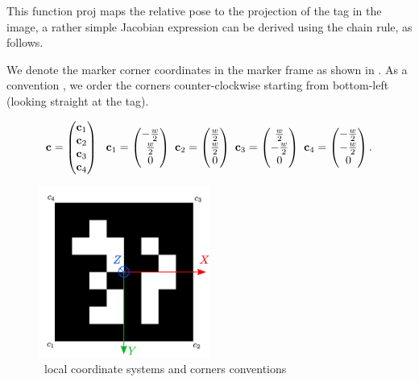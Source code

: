 This function $\text{proj}$ maps the relative pose to the projection of the tag in the image, a rather simple Jacobian expression can be derived using the chain rule, as follows.

We denote the marker corner coordinates in the marker frame as shown in . As a convention 
\cite{wang2016iros}, we order the corners counter-clockwise starting from bottom-left (looking straight at the tag). 

\begin{equation}
    {\bf c} =
    \begin{pmatrix}
    {\bf c}_1 \\ {\bf c}_2 \\ {\bf c}_3 \\ {\bf c}_4
    \end{pmatrix}
    ~~
    {\bf c}_1 =  \begin{pmatrix} -\frac{w}{2} \\ \frac{w}{2} \\ 0 \end{pmatrix}
    ~ 
    {\bf c}_2 =  \begin{pmatrix} \frac{w}{2} \\ \frac{w}{2} \\ 0 \end{pmatrix}
    ~
    {\bf c}_3 =  \begin{pmatrix} \frac{w}{2} \\ -\frac{w}{2} \\ 0 \end{pmatrix}
    ~
    {\bf c}_4 =  \begin{pmatrix} -\frac{w}{2} \\ -\frac{w}{2} \\ 0 \end{pmatrix}.
\end{equation}

%
\begin{figure}
    \centering
    \includegraphics[width=0.5\textwidth]{figures/tag12_frame.png}
    \caption{\apriltag~local coordinate systems and corners conventions \cite{wang2016iros}}
    \label{fig:apriltag_coordinate_frame}
\end{figure}

